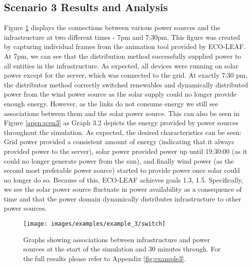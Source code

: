 \documentclass{l4proj}
\begin{document}
\subsection{Scenario 3 Results and Analysis}
Figure \ref{fig:example2_switch} displays the connections between various power sources and the infrastructure at two different times - 7pm and 7:30pm.
This figure was created by capturing individual frames from the animation tool provided by ECO-LEAF.
At 7pm, we can see that the distribution method successfully supplied power to all entities in the infrastructure.
As expected, all devices were running on solar power except for the server, which was connected to the grid.
At exactly 7:30 pm, the distributor method correctly switched renewables and dynamically distributed power from the wind power source as the solar supply could no longer provide enough energy.
However, as the links do not consume energy we still see associations between them and the solar power source.
This can also be seen in Figure \ref{apen:scen3} as Graph 3.2 depicts the energy provided by power sources throughout the simulation.
As expected, the desired characteristics can be seen: Grid power provided a consistent amount of energy (indicating that it always provided power to the server), solar power provided power up until 19:30:00 (as it could no longer generate power from the sun), and finally wind power (as the second most preferable power source) started to provide power once solar could no longer do so.
Because of this, ECO-LEAF achieves goals 1.3, 1.5.
Specifically, we see the solar power source fluctuate in power availability as a consequence of time and that the power domain dynamically distributes infrastructure to other power sources.
\begin{figure}
    \centering
    \texttt{[image: images/examples/example\_3/switch]}
    \caption{Graphs showing associations between infrastructure and power sources at the start of the simulation and 30 minutes through. For the full results please refer to Appendix \ref{fig:example3}.}
    \label{fig:example2_switch}
\end{figure}
\end{document}
